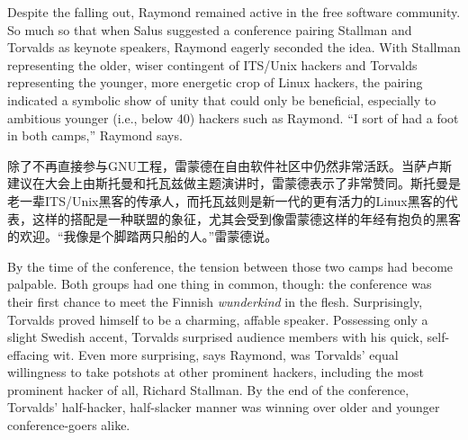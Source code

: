 \ifdefined\eng
Despite the falling out, Raymond remained active in the free software community. So much so that when Salus suggested a conference pairing Stallman and Torvalds as keynote speakers, Raymond eagerly seconded the idea. With Stallman representing the older, wiser contingent of ITS/Unix hackers and Torvalds representing the younger, more energetic crop of Linux hackers, the pairing indicated a symbolic show of unity that could only be beneficial, especially to ambitious younger (i.e., below 40) hackers such as Raymond. ``I sort of had a foot in both camps,'' Raymond says.
\fi

\ifdefined\chs
除了不再直接参与GNU工程，雷蒙德在自由软件社区中仍然非常活跃。当萨卢斯建议在大会上由斯托曼和托瓦兹做主题演讲时，雷蒙德表示了非常赞同。斯托曼是老一辈ITS/Unix黑客的传承人，而托瓦兹则是新一代的更有活力的Linux黑客的代表，这样的搭配是一种联盟的象征，尤其会受到像雷蒙德这样的年经有抱负的黑客的欢迎。``我像是个脚踏两只船的人。''雷蒙德说。
\fi

\ifdefined\eng
By the time of the conference, the tension between those two camps had become palpable. Both groups had one thing in common, though: the conference was their first chance to meet the Finnish \textit{wunderkind} in the flesh. Surprisingly, Torvalds proved himself to be a charming, affable speaker. Possessing only a slight Swedish accent, Torvalds surprised audience members with his quick, self-effacing wit. Even more surprising, says Raymond, was Torvalds' equal willingness to take potshots at other prominent hackers, including the most prominent hacker of all, Richard Stallman. By the end of the conference, Torvalds' half-hacker, half-slacker manner was winning over older and younger conference-goers alike.
\fi

